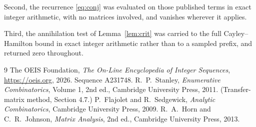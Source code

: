\documentclass[11pt,a4paper]{article}
\theoremstyle{plain}
\theoremstyle{definition}
\begin{document}
Second, the recurrence \eqref{eq:conj} was evaluated on those published terms in exact
integer arithmetic, with no matrices involved, and vanishes wherever it applies.

Third, the annihilation test of Lemma~\ref{lem:crit} was carried to the full
Cayley--Hamilton bound in exact integer arithmetic rather than to a sampled prefix, and
returned zero throughout.

\begin{thebibliography}{9}
 The OEIS Foundation, \emph{The On-Line Encyclopedia of Integer
Sequences}, \url{https://oeis.org}, 2026. Sequence A231748.
 R.~P.~Stanley, \emph{Enumerative Combinatorics}, Volume 1, 2nd ed.,
Cambridge University Press, 2011. (Transfer-matrix method, Section 4.7.)
 P.~Flajolet and R.~Sedgewick, \emph{Analytic Combinatorics}, Cambridge
University Press, 2009.
 R.~A.~Horn and C.~R.~Johnson, \emph{Matrix Analysis}, 2nd ed., Cambridge
University Press, 2013.
\end{thebibliography}
\end{document}
